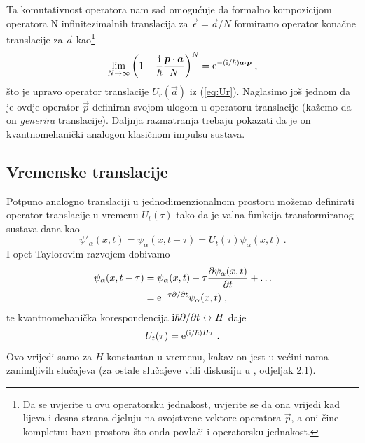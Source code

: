 Ta komutativnost operatora nam sad omogućuje da formalno kompozicijom
operatora N infinitezimalnih translacija za $\vec{\epsilon} = \vec{a}/N$ formiramo 
operator konačne translacije za $\vec{a}$ kao\footnote{Da se uvjerite u ovu
    operatorsku jednakost, uvjerite se da ona vrijedi kad lijeva i desna
    strana djeluju na svojstvene vektore operatora $\vec{p}$, a oni
    čine kompletnu bazu prostora što onda povlači i operatorsku jednakost.}
\begin{equation}
    \lim_{N\to\infty} \left(1 - \frac{\rmi}{\hbar} \frac{\vec{p}\cdot\vec{a}}{N} \right)^N
        = \rme^{-(\rmi/\hbar)\vec{a}\cdot\vec{p}} \;,
\end{equation}
što je upravo operator translacije $U_r(\vec{a})$ iz (\ref{eq:Ur}).
 
Naglasimo još jednom da je ovdje operator $\vec{p}$ definiran svojom ulogom
u operatoru translacije (kažemo da on \emph{generira} translacije). 
Daljnja razmatranja trebaju pokazati
da je on kvantnomehanički analogon klasičnom impulsu sustava.


\subsection{Vremenske translacije}
\label{sec:vremensketranslacije}
 

Potpuno analogno translaciji u jednodimenzionalnom prostoru
možemo definirati operator translacije u vremenu $U_{t}(\tau)$
tako da je valna funkcija transformiranog sustava dana kao
\begin{equation}
 \psi'_{\alpha}(x,t) = \psi_{\alpha}(x,t-\tau) = U_{t}(\tau)\psi_{\alpha}(x,t)\,.
\end{equation}
I opet Taylorovim razvojem dobivamo
\begin{equation}
\begin{split}
 \psi_{\alpha}(x,t-\tau)&=\psi_{\alpha}(x,t)-\tau\frac{\partial\psi_{\alpha}(x,t)}
{\partial t}+\ldots \\
&=\textrm{e}^{-\tau \partial / \partial  t} \psi_{\alpha}(x,t) \;,
\end{split}
\end{equation}
te kvantnomehanička korespondencija $\textrm{i}\hbar\partial /\partial t \leftrightarrow H$
daje
\begin{equation}
U_t(\tau)= \textrm{e}^{(\textrm{i}/\hbar)H\tau} \;.
\end{equation}
Ovo vrijedi samo za $H$ konstantan u vremenu, kakav on jest u većini
nama zanimljivih slučajeva (za ostale slučajeve
vidi diskusiju u \cite{Sakurai:2011}, odjeljak 2.1).

